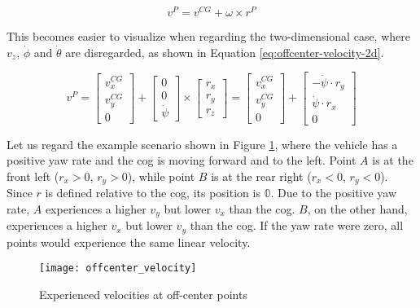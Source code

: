 \begin{equation}\label{eq:offcenter-velocity-3d}%
v^P = v^{CG} + \omega \times r^P%
\end{equation}

This becomes easier to visualize when regarding the two-dimensional case, where $v_z$, $\dot{\phi}$ and $\dot{\theta}$ are disregarded, as shown in Equation \ref{eq:offcenter-velocity-2d}.

\begin{equation}\label{eq:offcenter-velocity-2d}%
v^P%
= \begin{bmatrix}v_x^{CG} \\ v_y^{CG} \\ 0\end{bmatrix} + \begin{bmatrix}0 \\ 0 \\ \dot{\psi}\end{bmatrix} \times \begin{bmatrix}r_x \\ r_y \\ r_z\end{bmatrix}%
= \begin{bmatrix}v_x^{CG} \\ v_y^{CG} \\ 0\end{bmatrix} + \begin{bmatrix}-\dot{\psi} \cdot r_y \\ \dot{\psi} \cdot r_x \\ 0\end{bmatrix}%
 \end{equation}

Let us regard the example scenario shown in Figure \ref{fig:offcenter-velocity}, where the vehicle has a positive yaw rate and the \gls{cog} is moving forward and to the left. Point $A$ is at the front left ($r_x > 0$, $r_y > 0$), while point $B$ is at the rear right ($r_x < 0$, $r_y < 0$). Since $r$ is defined relative to the \gls{cog}, its position is $\mathbb{0}$. Due to the positive yaw rate, $A$ experiences a higher $v_y$ but lower $v_x$ than the \gls{cog}. $B$, on the other hand, experiences a higher $v_x$ but lower $v_y$ than the \gls{cog}. If the yaw rate were zero, all points would experience the same linear velocity.

\begin{figure}
	\centering
	\texttt{[image: offcenter\_velocity]}%
	\caption{Experienced velocities at off-center points}
	\label{fig:offcenter-velocity}
\end{figure}


